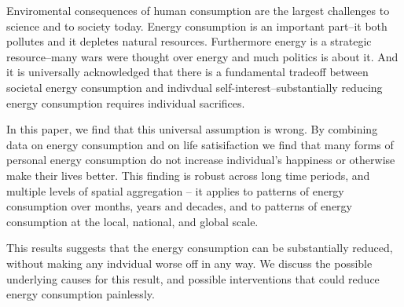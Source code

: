 \documentclass[10pt, letterpaper]{article}
\begin{document}
\vspace{.15in} 

\begin{spacing}{1.4}




Enviromental consequences of human consumption are the largest challenges to
science and to society today.  Energy consumption is an important part--it both
pollutes and it depletes natural resources. Furthermore energy is a strategic
resource--many wars were thought over energy and much politics is about it.
And it is universally acknowledged that there is a fundamental tradeoff between societal energy consumption and indivdual self-interest--substantially reducing energy consumption requires individual sacrifices. 


In this paper, we find that this universal assumption is wrong.  By combining data on energy consumption and on life satisifaction we find that  many forms of personal energy consumption do not increase individual's happiness or otherwise make their lives better. This finding is robust across long time periods, and multiple levels of spatial aggregation -- it applies to patterns of energy consumption over months, years and decades,  and to patterns of energy consumption at the local, national, and global scale.  

This results suggests that the energy consumption can be substantially reduced, without making any indvidual worse off in any way.  We discuss the possible underlying causes for this result, and  possible interventions that could reduce energy consumption painlessly.


\end{spacing}
\end{document}
